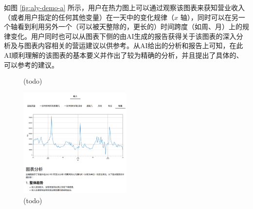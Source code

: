 如图 \ref{fig:aly-demo-a} 所示，用户在热力图上可以通过观察该图表来获知营业收入（或者用户指定的任何其他变量）在一天中的变化规律（$x$ 轴），同时可以在另一个轴看到利用另外一个（可以被天整除的，更长的）时间跨度（如周、月）上的规律变化。用户同时也可以从图表下侧的由AI生成的报告获得关于该图表的深入分析及与图表内容相关的营运建议以供参考。从AI给出的分析和报告上可知，在此AI顺利理解的该图表的基本要义并作出了较为精确的分析，并且提出了具体的、可以参考的建议。

\begin{figure}[htbp]
	\caption{(todo)}
	\label{fig:aly-demo-b}
\end{figure}

\begin{figure}[htbp]
	\centering
	\includegraphics[width=0.5\textwidth]{./exp/aly-demo-5.png}
	\caption{(todo)}
	\label{fig:aly-demo-5}
\end{figure}

